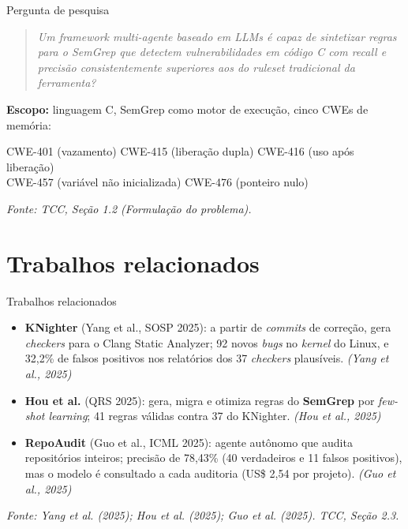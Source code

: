 \documentclass[
    aspectratio=169,
    12pt,
    brazil
]{beamer}
\newcommand{\fonte}[1]{{\tiny\itshape Fonte: #1\par}}
\newcommand{\cit}[1]{{\scriptsize\itshape (#1)}}
\begin{document}
\begin{frame}{Pergunta de pesquisa}
  \begin{quote}
    \itshape Um \textit{framework} multi-agente baseado em LLMs é capaz de sintetizar regras para o SemGrep que detectem vulnerabilidades em código C com \textit{recall} e precisão consistentemente superiores aos do \textit{ruleset} tradicional da ferramenta?
  \end{quote}
  \vspace{0.3cm}
  \textbf{Escopo:} linguagem C, SemGrep como motor de execução, cinco CWEs de memória:
  \begin{center}
  \small CWE-401 (vazamento) \quad CWE-415 (liberação dupla) \quad CWE-416 (uso após liberação)\\
  CWE-457 (variável não inicializada) \quad CWE-476 (ponteiro nulo)
  \end{center}
  \vfill
  \fonte{TCC, Seção 1.2 (Formulação do problema).}
\end{frame}

\section{Trabalhos relacionados}
\begin{frame}{Trabalhos relacionados}
  \begin{itemize}
    \item \textbf{KNighter} (Yang et al., SOSP 2025): a partir de \textit{commits} de correção, gera \textit{checkers} para o Clang Static Analyzer; 92 novos \textit{bugs} no \textit{kernel} do Linux, e 32,2\% de falsos positivos nos relatórios dos 37 \textit{checkers} plausíveis. \cit{Yang et al., 2025}
    \item \textbf{Hou et al.} (QRS 2025): gera, migra e otimiza regras do \textbf{SemGrep} por \textit{few-shot learning}; 41 regras válidas contra 37 do KNighter. \cit{Hou et al., 2025}
    \item \textbf{RepoAudit} (Guo et al., ICML 2025): agente autônomo que audita repositórios inteiros; precisão de 78,43\% (40 verdadeiros e 11 falsos positivos), mas o modelo é consultado a cada auditoria (US\$ 2,54 por projeto). \cit{Guo et al., 2025}
  \end{itemize}
  \vfill
  \fonte{Yang et al. (2025); Hou et al. (2025); Guo et al. (2025). TCC, Seção 2.3.}
\end{frame}
\end{document}
